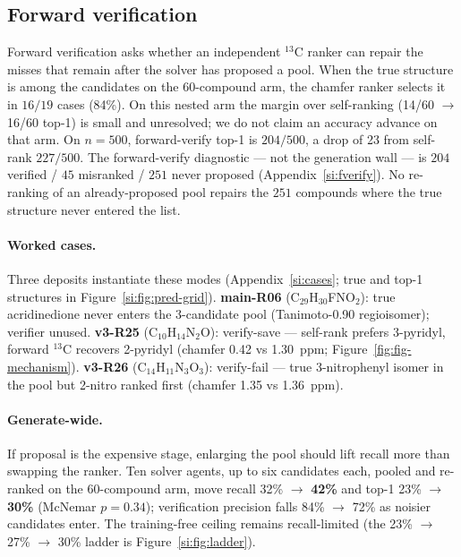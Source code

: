 \documentclass{article}
\begin{document}
\subsection{Forward verification}
\label{sec:forward-verify}

Forward verification asks whether an independent $^{13}$C ranker can
repair the misses that remain after the solver has proposed a pool.
When the true structure is among the candidates on the 60-compound arm,
the chamfer ranker selects it in $16/19$ cases (84\%).
On this nested arm the margin over self-ranking (14/60 $\to$ 16/60 top-1) is small and
unresolved; we do not claim an accuracy advance on that arm.
On $n{=}500$, forward-verify top-1 is $204/500$, a drop of 23 from self-rank
$227/500$.
The forward-verify diagnostic --- not the generation wall --- is
$204$ verified / $45$ misranked / $251$ never proposed
(Appendix~\ref{si:fverify}).
No re-ranking of an already-proposed pool repairs the $251$ compounds
where the true structure never entered the list.

\paragraph{Worked cases.}
Three deposits instantiate these modes (Appendix~\ref{si:cases}; true and top-1 structures in Figure~\ref{si:fig:pred-grid}).
\textbf{main-R06} (C$_{29}$H$_{30}$FNO$_{2}$): true acridinedione never enters the 3-candidate
pool (Tanimoto-0.90 regioisomer); verifier unused.
\textbf{v3-R25} (C$_{10}$H$_{14}$N$_{2}$O): verify-save --- self-rank prefers 3-pyridyl,
forward $^{13}$C recovers 2-pyridyl (chamfer 0.42 vs 1.30~ppm; Figure~\ref{fig:fig-mechanism}).
\textbf{v3-R26} (C$_{14}$H$_{11}$N$_{3}$O$_{3}$): verify-fail --- true 3-nitrophenyl isomer in
the pool but 2-nitro ranked first (chamfer 1.35 vs 1.36~ppm).

\paragraph{Generate-wide.}
If proposal is the expensive stage, enlarging the pool should lift recall
more than swapping the ranker.
Ten solver agents, up to six candidates each, pooled and re-ranked on the
60-compound arm, move recall 32\% $\to$ \textbf{42\%} and top-1 23\%
$\to$ \textbf{30\%} (McNemar $p{=}0.34$); verification precision falls
84\% $\to$ 72\% as noisier candidates enter.
The training-free ceiling remains recall-limited
(the 23\% $\to$ 27\% $\to$ 30\% ladder is Figure~\ref{si:fig:ladder}).
\end{document}
